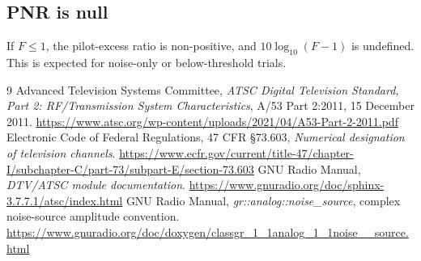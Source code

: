 \documentclass[10pt,letterpaper]{article}
\begin{document}
\subsection{PNR is null}
If \(F\leq1\), the pilot-excess ratio is non-positive, and \(10\log_{10}(F-1)\) is undefined.  This is expected for noise-only or below-threshold trials.

\begin{thebibliography}{9}
 Advanced Television Systems Committee, \emph{ATSC Digital Television Standard, Part 2: RF/Transmission System Characteristics}, A/53 Part 2:2011, 15 December 2011. \url{https://www.atsc.org/wp-content/uploads/2021/04/A53-Part-2-2011.pdf}
 Electronic Code of Federal Regulations, 47 CFR \S 73.603, \emph{Numerical designation of television channels}. \url{https://www.ecfr.gov/current/title-47/chapter-I/subchapter-C/part-73/subpart-E/section-73.603}
 GNU Radio Manual, \emph{DTV/ATSC module documentation}. \url{https://www.gnuradio.org/doc/sphinx-3.7.7.1/atsc/index.html}
 GNU Radio Manual, \emph{gr::analog::noise\_source}, complex noise-source amplitude convention. \url{https://www.gnuradio.org/doc/doxygen/classgr_1_1analog_1_1noise__source.html}
\end{thebibliography}
\end{document}
